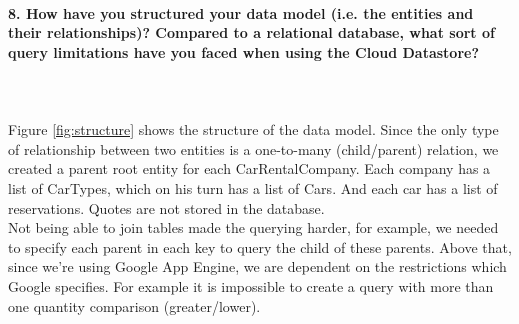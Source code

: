 \documentclass{ds-report}
\begin{document}
	\paragraph{8. How have you structured your data model (i.e. the entities and their relationships)? Compared to a relational database, what sort of query limitations have you faced when using the Cloud Datastore?} \mbox{}\\\\
	Figure \ref{fig:structure} shows the structure of the data model. Since the only type of relationship between two entities is a one-to-many (child/parent) relation, we created a parent root entity for each CarRentalCompany. Each company has a list of CarTypes, which on his turn has a list of Cars. And each car has a list of reservations. Quotes are not stored in the database.\\
Not being able to join tables made the querying harder, for example, we needed to specify each parent in each key to query the child of these parents. Above that, since we're using Google App Engine, we are dependent on the restrictions which Google specifies. For example it is impossible to create a query with more than one quantity comparison (greater/lower). 
	
\end{document}
